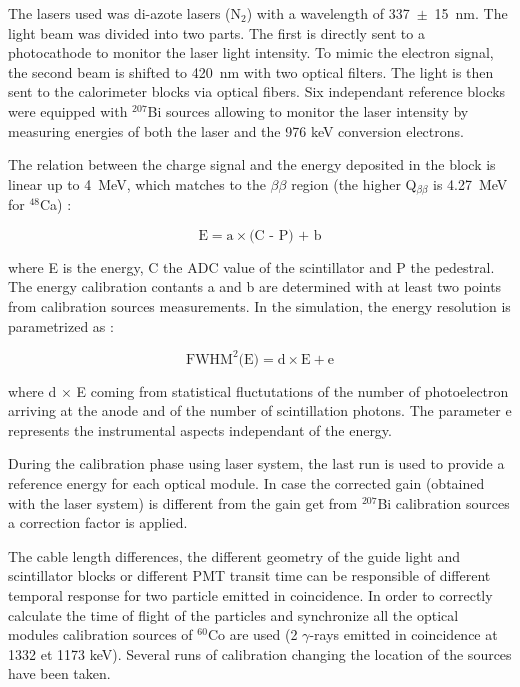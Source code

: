 \documentclass[main.tex]{subfiles}
\begin{document}
\bigskip


\NI The lasers used was di-azote lasers (N$_\text{2}$) with a wavelength of 337~$\pm$~15~nm. The light beam was divided into two parts. The first is directly sent to a photocathode to monitor the laser light intensity. To mimic the electron signal, the second beam is shifted to 420~nm with two optical filters. The light is then sent to the calorimeter blocks via optical fibers. Six independant reference blocks were equipped with $^{\text{207}}$Bi sources allowing to monitor the laser intensity by measuring energies of both the laser and the 976 keV conversion electrons.


\bigskip


\NI The relation between the charge signal and the energy deposited in the block is linear up to 4~MeV, which matches to the $\beta\beta$ region (the higher Q$_{\beta\beta}$ is 4.27~MeV for $^{\text{48}}$Ca) : 


\begin{equation}
\text{E} = \text{a} \times \text{(C - P) + b} 
\end{equation}


\NI where E is the energy, C the ADC value of the scintillator and P the pedestral. The energy calibration contants a and b are determined with at least two points from calibration sources measurements. In the simulation, the energy resolution is parametrized as :


\begin{equation}
\text{FWHM}^\text{2} \text{(E)} = \text{d} \times \text{E} + \text{e}
\end{equation} 

\NI where d $\times$ E coming from statistical fluctutations of the number of photoelectron arriving at the anode and of the number of scintillation photons. The parameter e represents the instrumental aspects independant of the energy.


\bigskip


\NI During the calibration phase using laser system, the last run is used to provide a reference energy for each optical module. In case the corrected gain (obtained with the laser system) is different from the gain get from $^{\text{207}}$Bi calibration sources a correction factor is applied.


\bigskip


\NI The cable length differences, the different geometry of the guide light and scintillator blocks or different PMT transit time can be responsible of different temporal response for two particle emitted in coincidence. In order to correctly calculate the time of flight of the particles and synchronize all the optical modules calibration sources of $^{\text{60}}$Co are used (2 $\gamma$-rays emitted in coincidence at 1332 et 1173 keV). Several runs of calibration changing the location of the sources have been taken.
\end{document}
